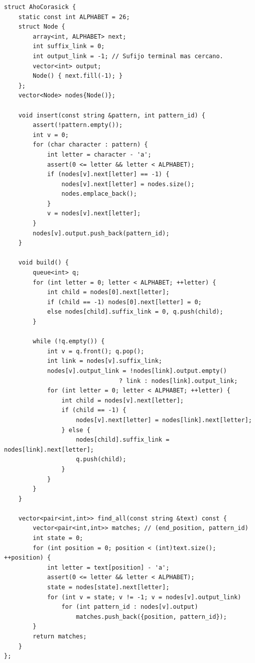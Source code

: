 \begin{lstlisting}[style=cpp]
struct AhoCorasick {
    static const int ALPHABET = 26;
    struct Node {
        array<int, ALPHABET> next;
        int suffix_link = 0;
        int output_link = -1; // Sufijo terminal mas cercano.
        vector<int> output;
        Node() { next.fill(-1); }
    };
    vector<Node> nodes{Node()};

    void insert(const string &pattern, int pattern_id) {
        assert(!pattern.empty());
        int v = 0;
        for (char character : pattern) {
            int letter = character - 'a';
            assert(0 <= letter && letter < ALPHABET);
            if (nodes[v].next[letter] == -1) {
                nodes[v].next[letter] = nodes.size();
                nodes.emplace_back();
            }
            v = nodes[v].next[letter];
        }
        nodes[v].output.push_back(pattern_id);
    }

    void build() {
        queue<int> q;
        for (int letter = 0; letter < ALPHABET; ++letter) {
            int child = nodes[0].next[letter];
            if (child == -1) nodes[0].next[letter] = 0;
            else nodes[child].suffix_link = 0, q.push(child);
        }

        while (!q.empty()) {
            int v = q.front(); q.pop();
            int link = nodes[v].suffix_link;
            nodes[v].output_link = !nodes[link].output.empty()
                                ? link : nodes[link].output_link;
            for (int letter = 0; letter < ALPHABET; ++letter) {
                int child = nodes[v].next[letter];
                if (child == -1) {
                    nodes[v].next[letter] = nodes[link].next[letter];
                } else {
                    nodes[child].suffix_link = nodes[link].next[letter];
                    q.push(child);
                }
            }
        }
    }

    vector<pair<int,int>> find_all(const string &text) const {
        vector<pair<int,int>> matches; // (end_position, pattern_id)
        int state = 0;
        for (int position = 0; position < (int)text.size(); ++position) {
            int letter = text[position] - 'a';
            assert(0 <= letter && letter < ALPHABET);
            state = nodes[state].next[letter];
            for (int v = state; v != -1; v = nodes[v].output_link)
                for (int pattern_id : nodes[v].output)
                    matches.push_back({position, pattern_id});
        }
        return matches;
    }
};
\end{lstlisting}

